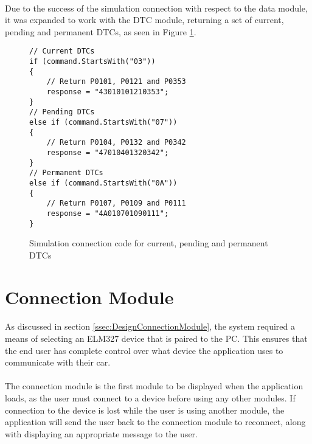 {{		\paragraph{}{
		Due to the success of the simulation connection with respect to the data module, it was expanded to work with the DTC module, returning a set of current, pending and permanent DTCs, as seen in Figure \ref{code:SimConnectionDTC}.
		}
	\newpage	
		\begin{figure}[h]
			\begin{lstlisting}
// Current DTCs
if (command.StartsWith("03"))
{
	// Return P0101, P0121 and P0353	
	response = "43010101210353";
}
// Pending DTCs
else if (command.StartsWith("07"))
{
	// Return P0104, P0132 and P0342	
	response = "47010401320342";
}
// Permanent DTCs
else if (command.StartsWith("0A"))
{
	// Return P0107, P0109 and P0111	
	response = "4A010701090111";
}			
			\end{lstlisting}
			\caption{Simulation connection code for current, pending and permanent DTCs}
			\label{code:SimConnectionDTC}
		\end{figure}
\label{sec:Simulation}
}

\section{Connection Module}
		\paragraph{}{
		As discussed in section \ref{ssec:DesignConnectionModule}, the system required a means of selecting an ELM327 device that is paired to the PC. This ensures that the end user has complete control over what device the application uses to communicate with their car.
		}
		
		\paragraph{}{
		The connection module is the first module to be displayed when  the application loads, as the user must connect to a device before using any other modules. If connection to the device is lost while the user is using another module, the application will send the user back to the connection module to reconnect, along with displaying an appropriate message to the user.
		}
		
}
